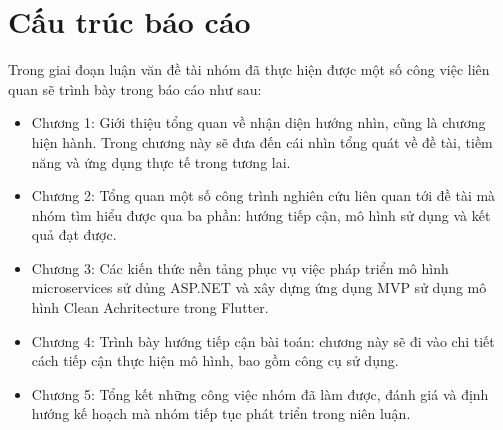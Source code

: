 \section{Cấu trúc báo cáo}
Trong giai đoạn luận văn đề tài nhóm đã thực hiện được một số công việc liên quan sẽ trình bày trong báo cáo như sau:

\begin{itemize}
    \item Chương 1: Giới thiệu tổng quan về nhận diện hướng nhìn, cũng là chương hiện hành. Trong chương này sẽ đưa đến cái nhìn tổng quát về đề tài, tiềm năng và ứng dụng thực tế trong tương lai.
    \item Chương 2: Tổng quan một số công trình nghiên cứu liên quan tới đề tài mà nhóm tìm hiểu được qua ba phần: hướng tiếp cận, mô hình sử dụng và kết quả đạt được.
    \item Chương 3: Các kiến thức nền tảng phục vụ việc pháp triển mô hình microservices sử dủng ASP.NET và xây dựng ứng dụng MVP sử dụng mô hình Clean Achritecture trong Flutter.
    \item Chương 4: Trình bày hướng tiếp cận bài toán: chương này sẽ đi vào chi tiết cách tiếp cận thực hiện mô hình, bao gồm công cụ sử dụng.
    \item Chương 5: Tổng kết những công việc nhóm đã làm được, đánh giá và định hướng kế hoạch mà nhóm tiếp tục phát triển trong niên luận.
\end{itemize}


